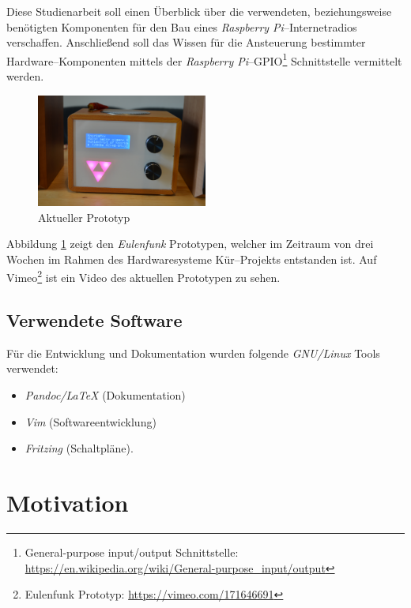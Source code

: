 \documentclass[11pt,ngerman,toc=listof,index=totoc]{scrreprt}
\providecommand{\tightlist}{%
  \setlength{\itemsep}{0pt}\setlength{\parskip}{0pt}}
\begin{document}
Diese Studienarbeit soll einen Überblick über die verwendeten,
beziehungsweise benötigten Komponenten für den Bau eines \emph{Raspberry
Pi}--Internetradios verschaffen. Anschließend soll das Wissen für die
Ansteuerung bestimmter Hardware--Komponenten mittels der \emph{Raspberry
Pi}--GPIO\footnote{General-purpose input/output Schnittstelle:
  \url{https://en.wikipedia.org/wiki/General-purpose_input/output}}
Schnittstelle vermittelt werden.

\begin{figure}[h!]
  \centering
\includegraphics[width=0.5\textwidth]{images/front_3.png}
  \caption{Aktueller Prototyp}
  \label{fertig}
\end{figure}

\newpage 

Abbildung \ref{fertig} zeigt den \emph{Eulenfunk} Prototypen, welcher im
Zeitraum von drei Wochen im Rahmen des Hardwaresysteme Kür--Projekts
entstanden ist. Auf Vimeo\footnote{Eulenfunk Prototyp:
  \url{https://vimeo.com/171646691}} ist ein Video des aktuellen
Prototypen zu sehen.

\section{Verwendete Software}\label{verwendete-software}

Für die Entwicklung und Dokumentation wurden folgende \emph{GNU/Linux}
Tools verwendet:

\begin{itemize}
\tightlist
\item
  \emph{Pandoc/LaTeX} (Dokumentation)
\item
  \emph{Vim} (Softwareentwicklung)
\item
  \emph{Fritzing} (Schaltpläne).
\end{itemize}

\chapter{Motivation}\label{motivation}
\end{document}

